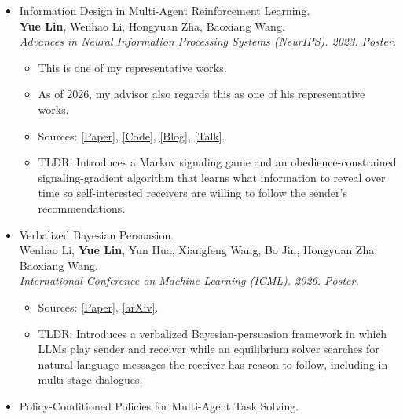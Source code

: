 \documentclass[a4paper,20pt]{article}
\begin{document}
\begin{itemize}[leftmargin=*,itemsep=0pt,topsep=0pt,partopsep=0pt]

\item Information Design in Multi-Agent Reinforcement Learning. \\
      \textbf{Yue Lin}, Wenhao Li, Hongyuan Zha, Baoxiang Wang. \\
      \textit{Advances in Neural Information Processing Systems (NeurIPS). 2023. Poster.}
      \begin{itemize}[itemsep=0pt,topsep=0pt,partopsep=0pt]
        \item This is one of my representative works.
        \item As of 2026, my advisor also regards this as one of his representative works.
        \item Sources:
                \href{https://arxiv.org/abs/2305.06807}{[Paper]},
                \href{https://github.com/YueLin301/InformationDesignMARL}{[Code]},
                \href{https://yuelin301.github.io/posts/IDMARL/}{[Blog]},
                \href{https://www.youtube.com/watch?v=yhVlpv_1Pg4}{[Talk]}.
        \item TLDR: Introduces a Markov signaling game and an obedience-constrained signaling-gradient algorithm that learns what information to reveal over time so self-interested receivers are willing to follow the sender's recommendations.
      \end{itemize}
\item Verbalized Bayesian Persuasion. \\
      Wenhao Li, \textbf{Yue Lin}, Yun Hua, Xiangfeng Wang, Bo Jin, Hongyuan Zha, Baoxiang Wang. \\
      \textit{International Conference on Machine Learning (ICML). 2026. Poster.}
      \begin{itemize}[itemsep=0pt,topsep=0pt,partopsep=0pt]
        \item Sources:
            \href{https://openreview.net/forum?id=dc0WdvWSnB}{[Paper]},
            \href{https://arxiv.org/abs/2502.01587}{[arXiv]}.
        \item TLDR: Introduces a verbalized Bayesian-persuasion framework in which LLMs play sender and receiver while an equilibrium solver searches for natural-language messages the receiver has reason to follow, including in multi-stage dialogues.
      \end{itemize}
\item Policy-Conditioned Policies for Multi-Agent Task Solving. \\

\end{itemize}
\end{document}
